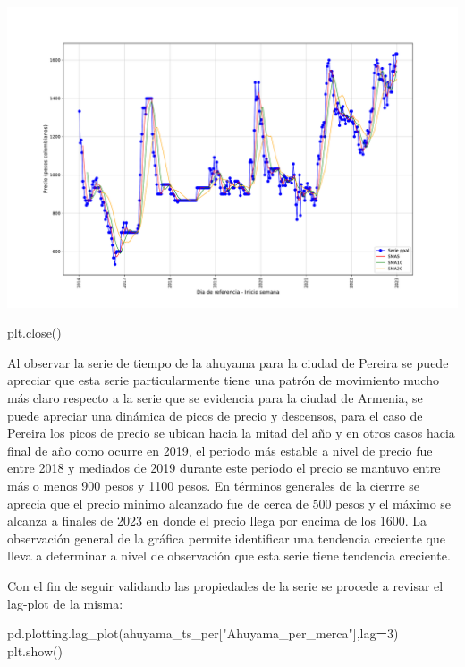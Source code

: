 \documentclass[
]{book}
\newenvironment{Shaded}{\begin{snugshade}}{\end{snugshade}}
\newcommand{\DecValTok}[1]{\textcolor[rgb]{0.00,0.00,0.81}{#1}}
\newcommand{\NormalTok}[1]{#1}
\newcommand{\OperatorTok}[1]{\textcolor[rgb]{0.81,0.36,0.00}{\textbf{#1}}}
\newcommand{\StringTok}[1]{\textcolor[rgb]{0.31,0.60,0.02}{#1}}
\begin{document}
\includegraphics{bookdown-demo_files/figure-latex/unnamed-chunk-85-57.pdf}

\begin{Shaded}
\begin{Highlighting}[]
\NormalTok{plt.close()}
\end{Highlighting}
\end{Shaded}

Al observar la serie de tiempo de la ahuyama para la ciudad de Pereira se puede apreciar que esta serie particularmente tiene una patrón de movimiento mucho más claro respecto a la serie que se evidencia para la ciudad de Armenia, se puede apreciar una dinámica de picos de precio y descensos, para el caso de Pereira los picos de precio se ubican hacia la mitad del año y en otros casos hacia final de año como ocurre en 2019, el periodo más estable a nivel de precio fue entre 2018 y mediados de 2019 durante este periodo el precio se mantuvo entre más o menos 900 pesos y 1100 pesos. En términos generales de la cierrre se aprecia que el precio minimo alcanzado fue de cerca de 500 pesos y el máximo se alcanza a finales de 2023 en donde el precio llega por encima de los 1600. La observación general de la gráfica permite identificar una tendencia creciente que lleva a determinar a nivel de observación que esta serie tiene tendencia creciente.

Con el fin de seguir validando las propiedades de la serie se procede a revisar el lag-plot de la misma:

\begin{Shaded}
\begin{Highlighting}[]

\NormalTok{pd.plotting.lag\_plot(ahuyama\_ts\_per[}\StringTok{"Ahuyama\_per\_merca"}\NormalTok{],lag}\OperatorTok{=}\DecValTok{3}\NormalTok{)}
\NormalTok{plt.show()}
\end{Highlighting}
\end{Shaded}
\end{document}
